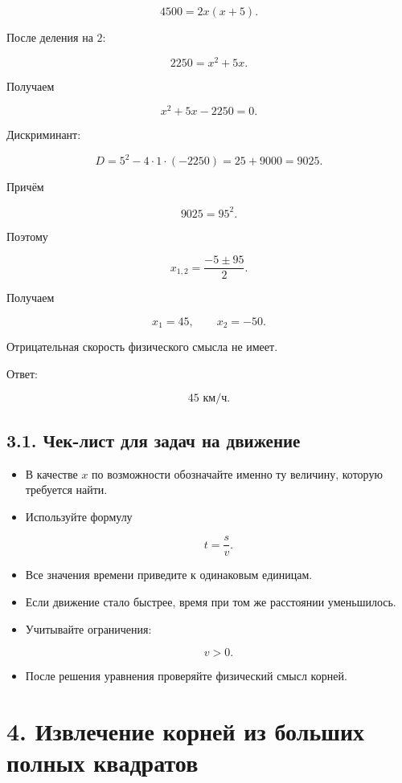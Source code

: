 \documentclass[a4paper,12pt]{article}
\newcommand{\checkitem}{\item[$\square$]}
\begin{document}
\[
4500=2x(x+5).
\]

После деления на \(2\):

\[
2250=x^2+5x.
\]

Получаем

\[
x^2+5x-2250=0.
\]

Дискриминант:

\[
D=5^2-4\cdot1\cdot(-2250)
=25+9000
=9025.
\]

Причём

\[
9025=95^2.
\]

Поэтому

\[
x_{1,2}
=
\frac{-5\pm95}{2}.
\]

Получаем

\[
x_1=45,
\qquad
x_2=-50.
\]

Отрицательная скорость физического смысла не имеет.

Ответ:

\[
\boxed{45\text{ км/ч}}.
\]

\subsection*{3.1. Чек-лист для задач на движение}

\begin{itemize}

\checkitem
В качестве \(x\) по возможности обозначайте именно ту величину,
которую требуется найти.

\checkitem
Используйте формулу

\[
t=\frac{s}{v}.
\]

\checkitem
Все значения времени приведите к одинаковым единицам.

\checkitem
Если движение стало быстрее, время при том же расстоянии уменьшилось.

\checkitem
Учитывайте ограничения:

\[
v>0.
\]

\checkitem
После решения уравнения проверяйте физический смысл корней.

\end{itemize}


\section*{\textcolor{darkaccent}{
4. Извлечение корней из больших полных квадратов
}}
\end{document}
